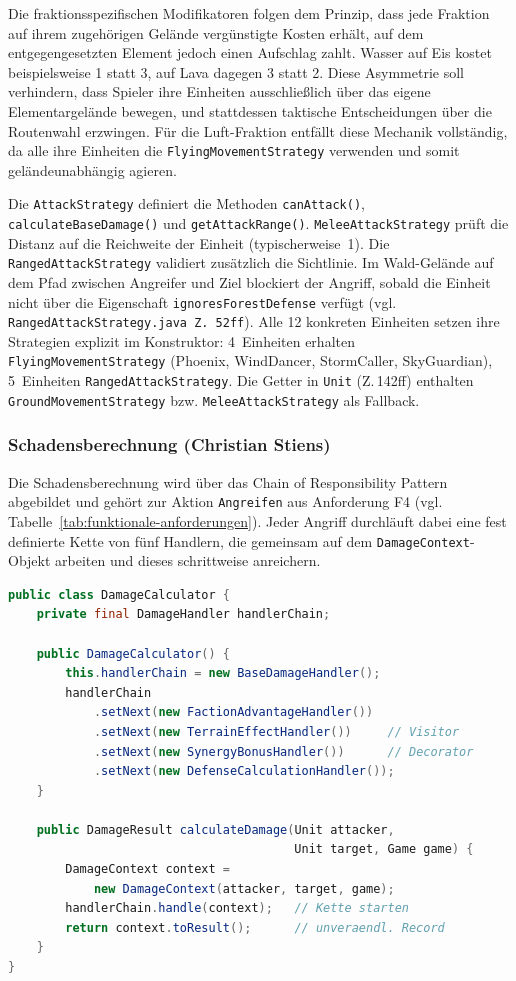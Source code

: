 Die fraktionsspezifischen Modifikatoren folgen dem Prinzip, dass jede Fraktion auf ihrem zugehörigen Gelände vergünstigte
Kosten erhält, auf dem entgegengesetzten Element jedoch einen Aufschlag zahlt. Wasser auf Eis kostet beispielsweise 1 statt 3,
auf Lava dagegen 3 statt 2. Diese Asymmetrie soll verhindern, dass Spieler ihre Einheiten ausschließlich über das eigene
Elementargelände bewegen, und stattdessen taktische Entscheidungen über die Routenwahl erzwingen. Für die Luft-Fraktion
entfällt diese Mechanik vollständig, da alle ihre Einheiten die \texttt{FlyingMovementStrategy} verwenden und somit
geländeunabhängig agieren.

Die \texttt{AttackStrategy} definiert die Methoden \texttt{canAttack()}, \texttt{calculateBaseDamage()} und \texttt{getAttackRange()}.
\texttt{MeleeAttackStrategy} prüft die Distanz auf die Reichweite der Einheit (typischerweise~1).
Die \texttt{RangedAttackStrategy} validiert zusätzlich die Sichtlinie. Im Wald-Gelände auf dem Pfad zwischen Angreifer
und Ziel blockiert der Angriff, sobald die Einheit nicht über die Eigenschaft \texttt{ignoresForestDefense} verfügt (vgl. \texttt{RangedAttackStrategy.java Z.\,52ff}).
Alle 12 konkreten Einheiten setzen ihre Strategien explizit im Konstruktor: 4~Einheiten erhalten \texttt{FlyingMovementStrategy}
(Phoenix, WindDancer, StormCaller, SkyGuardian), 5~Einheiten \texttt{RangedAttackStrategy}.
Die Getter in \texttt{Unit} (Z.\,142ff) enthalten \texttt{GroundMovementStrategy} bzw. \texttt{MeleeAttackStrategy} als Fallback.

\subsubsection{Schadensberechnung (Christian Stiens)}
\label{subsec:schadensberechnung}

Die Schadensberechnung wird über das Chain of Responsibility Pattern abgebildet und gehört zur Aktion \texttt{Angreifen} aus Anforderung F4 (vgl. Tabelle~\ref{tab:funktionale-anforderungen}).
Jeder Angriff durchläuft dabei eine fest definierte Kette von fünf Handlern, die gemeinsam auf dem \texttt{DamageContext}-Objekt arbeiten und dieses schrittweise anreichern.

\begin{lstlisting}[language=Java, caption={DamageCalculator -- Aufbau und Start der Handler-Kette}, label={lst:damage-calculator}]
public class DamageCalculator {
    private final DamageHandler handlerChain;

    public DamageCalculator() {
        this.handlerChain = new BaseDamageHandler();
        handlerChain
            .setNext(new FactionAdvantageHandler())
            .setNext(new TerrainEffectHandler())     // Visitor
            .setNext(new SynergyBonusHandler())      // Decorator
            .setNext(new DefenseCalculationHandler());
    }

    public DamageResult calculateDamage(Unit attacker,
                                        Unit target, Game game) {
        DamageContext context =
            new DamageContext(attacker, target, game);
        handlerChain.handle(context);   // Kette starten
        return context.toResult();      // unveraendl. Record
    }
}
\end{lstlisting}

